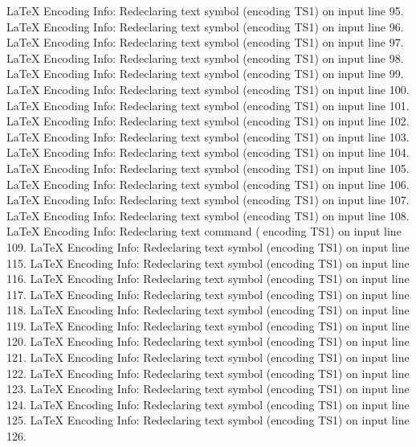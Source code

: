 LaTeX Encoding Info:    Redeclaring text symbol \textoneoldstyle (encoding TS1) on input line 95.
LaTeX Encoding Info:    Redeclaring text symbol \texttwooldstyle (encoding TS1) on input line 96.
LaTeX Encoding Info:    Redeclaring text symbol \textthreeoldstyle (encoding TS1) on input line 97.
LaTeX Encoding Info:    Redeclaring text symbol \textfouroldstyle (encoding TS1) on input line 98.
LaTeX Encoding Info:    Redeclaring text symbol \textfiveoldstyle (encoding TS1) on input line 99.
LaTeX Encoding Info:    Redeclaring text symbol \textsixoldstyle (encoding TS1) on input line 100.
LaTeX Encoding Info:    Redeclaring text symbol \textsevenoldstyle (encoding TS1) on input line 101.
LaTeX Encoding Info:    Redeclaring text symbol \texteightoldstyle (encoding TS1) on input line 102.
LaTeX Encoding Info:    Redeclaring text symbol \textnineoldstyle (encoding TS1) on input line 103.
LaTeX Encoding Info:    Redeclaring text symbol \textlangle (encoding TS1) on input line 104.
LaTeX Encoding Info:    Redeclaring text symbol \textminus (encoding TS1) on input line 105.
LaTeX Encoding Info:    Redeclaring text symbol \textrangle (encoding TS1) on input line 106.
LaTeX Encoding Info:    Redeclaring text symbol \textmho (encoding TS1) on input line 107.
LaTeX Encoding Info:    Redeclaring text symbol \textbigcircle (encoding TS1) on input line 108.
LaTeX Encoding Info:    Redeclaring text command \textcircled (encoding TS1) on input line 109.
LaTeX Encoding Info:    Redeclaring text symbol \textohm (encoding TS1) on input line 115.
LaTeX Encoding Info:    Redeclaring text symbol \textlbrackdbl (encoding TS1) on input line 116.
LaTeX Encoding Info:    Redeclaring text symbol \textrbrackdbl (encoding TS1) on input line 117.
LaTeX Encoding Info:    Redeclaring text symbol \textuparrow (encoding TS1) on input line 118.
LaTeX Encoding Info:    Redeclaring text symbol \textdownarrow (encoding TS1) on input line 119.
LaTeX Encoding Info:    Redeclaring text symbol \textasciigrave (encoding TS1) on input line 120.
LaTeX Encoding Info:    Redeclaring text symbol \textborn (encoding TS1) on input line 121.
LaTeX Encoding Info:    Redeclaring text symbol \textdivorced (encoding TS1) on input line 122.
LaTeX Encoding Info:    Redeclaring text symbol \textdied (encoding TS1) on input line 123.
LaTeX Encoding Info:    Redeclaring text symbol \textleaf (encoding TS1) on input line 124.
LaTeX Encoding Info:    Redeclaring text symbol \textmarried (encoding TS1) on input line 125.
LaTeX Encoding Info:    Redeclaring text symbol \textmusicalnote (encoding TS1) on input line 126.
